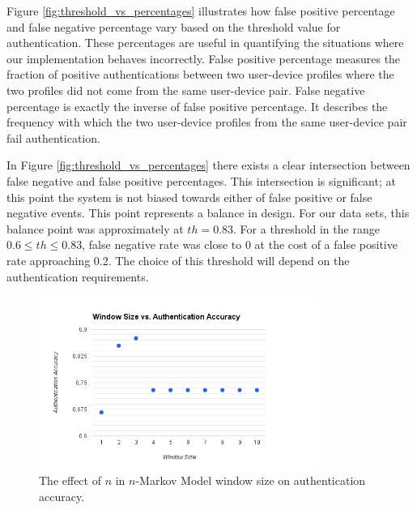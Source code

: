 \documentclass{acm_proc_article-sp}
\begin{document}


Figure \ref{fig:threshold_vs_percentages} illustrates how false positive percentage
and false negative percentage vary based on the threshold value for authentication.
These percentages are useful in quantifying the situations where
our implementation behaves incorrectly.
False positive percentage measures the fraction of positive authentications 
between two user-device profiles where 
the two profiles did not come from the same user-device pair.
False negative percentage is exactly the inverse of false positive percentage.
It describes the frequency with which the two user-device profiles 
from the same user-device pair fail authentication.

In Figure \ref{fig:threshold_vs_percentages} there exists a clear intersection between false negative and false positive percentages. This intersection is significant; at this point the system is not biased towards
either of false positive or false negative events. This point represents a balance in design. For our
data sets, this balance point was approximately at $th=0.83$. For a threshold in the range
$0.6 \leq th \leq 0.83$, false negative rate was close to 0 at the cost of a false positive rate approaching 0.2.
The choice of this threshold will depend on the authentication requirements.

\begin{figure}
\centering
\includegraphics[width=3.6in]{window_size_vs_authentication_accuracy.png}
\caption{The effect of $n$ in $n$-Markov Model window size on authentication accuracy.}
\label{fig:window_size_vs_authentication_accuracy}
\end{figure}
\end{document}
